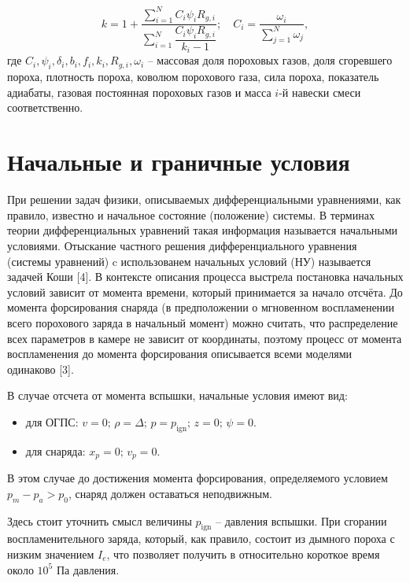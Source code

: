 \documentclass[14pt, a4paper]{extreport} %
\begin{document}
\begin{equation}
k = 1 + \frac{\sum_{i=1}^N C_i \psi_i R_{g,i}}{\sum_{i=1}^N \dfrac{C_i \psi_i R_{g,i}}{k_i - 1}}; \quad C_i = \frac{\omega_i}{\sum_{j=1}^N \omega_j},
\end{equation}
где \( C_i, \psi_i, \delta_i, b_i, f_i, k_i, R_{g,i}, \omega_i \) -- массовая доля пороховых газов, доля сгоревшего пороха, плотность пороха, коволюм порохового газа, сила пороха, показатель адиабаты, газовая постоянная пороховых газов и масса \(i\)-й навески смеси соответственно.

\section{Начальные и граничные условия}

При решении задач физики, описываемых дифференциальными уравнениями, как правило, известно и начальное состояние (положение) системы. В терминах теории дифференциальных уравнений такая информация называется начальными условиями. Отыскание частного решения дифференциального уравнения (системы уравнений) c использованем начальных условий (НУ) называется задачей Коши [4].
В контексте описания процесса выстрела постановка начальных условий зависит от момента времени, который принимается за начало отсчёта.
До момента форсирования снаряда (в
предположении о мгновенном воспламенении всего порохового заряда в
начальный момент) можно считать, что распределение всех параметров в
камере не зависит от координаты, поэтому процесс от момента воспламенения
до момента форсирования описывается всеми моделями одинаково [3].

В случае отсчета от момента вспышки, начальные условия имеют вид:

\begin{itemize}
    \item для ОГПС: \( v = 0; \, \rho = \Delta; \, p = p_{\text{ign}}; \, z = 0; \, \psi = 0. \)
    \item для снаряда: \( x_p = 0; \, v_p = 0. \)
\end{itemize}

В этом случае до достижения момента форсирования, определяемого условием \( p_m - p_a > p_0 \), снаряд должен оставаться неподвижным.

Здесь стоит уточнить смысл величины $p_{\text{ign}}$ -- давления вспышки. При сгорании воспламенительного заряда, который, как правило, состоит из дымного пороха с низким значением $I_e$, что позволяет получить в относительно короткое время около $10^5$ Па давления.
\end{document}
